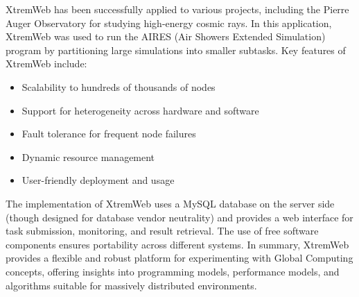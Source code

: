 XtremWeb has been successfully applied to various projects, including the Pierre Auger Observatory for studying high-energy cosmic rays. In this application, XtremWeb was used to run the AIRES (Air Showers Extended Simulation) program by partitioning large simulations into smaller subtasks.
Key features of XtremWeb include:
\begin{itemize}
  \item Scalability to hundreds of thousands of nodes
  \item Support for heterogeneity across hardware and software
  \item Fault tolerance for frequent node failures
  \item Dynamic resource management
  \item User-friendly deployment and usage
\end{itemize}
The implementation of XtremWeb uses a MySQL database on the server side (though designed for database vendor neutrality) and provides a web interface for task submission, monitoring, and result retrieval. The use of free software components ensures portability across different systems.
In summary, XtremWeb provides a flexible and robust platform for experimenting with Global Computing concepts, offering insights into programming models, performance models, and algorithms suitable for massively distributed environments. \cite{relatedwork:xtremweb}
